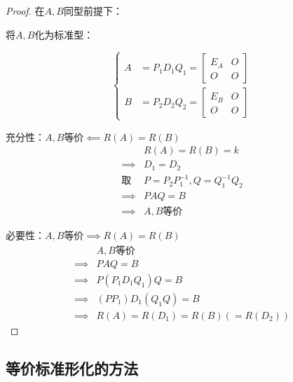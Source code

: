 \documentclass{article}
\begin{document}
\begin{proof}
    在$A,B$同型前提下：

    将$A,B$化为标准型：

    \[\left\{\begin{aligned}
            A & =P_1D_1Q_1 =
            \begin{bmatrix}
                E_A & O \\
                O   & O
            \end{bmatrix}   \\
            B & =P_2D_2Q_2 =
            \begin{bmatrix}
                E_B & O \\
                O   & O
            \end{bmatrix}
        \end{aligned}\right.\]

    充分性：$A,B\text{等价}\impliedby R\left(A\right)=R\left(B\right)$
    \[\begin{aligned}
                      & R\left(A\right)=R\left(B\right)=k \\
            \implies  & D_1=D_2
            \\
            \text{取} & P=P_2P_1^{-1},Q=Q_1^{-1}Q_2       \\
            \implies  & PAQ=B                             \\
            \implies  & A,B\text{等价}
        \end{aligned}\]

    必要性：$A,B\text{等价}\implies R\left(A\right)=R\left(B\right)$
    \[\begin{aligned}
                     & A,B\text{等价}                          \\
            \implies & PAQ=B                                   \\
            \implies & P\left(P_1D_1Q_1\right)Q=B              \\
            \implies & \left(PP_1\right)D_1\left(Q_1Q\right)=B \\
            \implies & R\left(A\right)=R\left(D_1\right)=
            R\left(B\right)\left(=R\left(D_2\right)\right)
        \end{aligned}\]
\end{proof}

\subsection{等价标准形化的方法}
\end{document}
